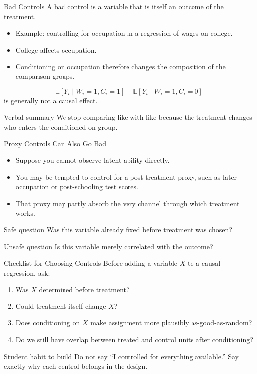 \documentclass[11pt,aspectratio=169]{beamer}
\newcommand{\E}{\mathbb{E}}
\newcommand{\derivbutton}[1]{\vspace{0.4em}\hfill\hyperlink{app:#1}{\beamerbutton{Appendix details}}}
\begin{document}
\begin{frame}{Bad Controls}
  \hypertarget{main:bad-control}{}
  A bad control is a variable that is itself an outcome of the treatment.
  \begin{itemize}
    \item Example: controlling for occupation in a regression of wages on college.
    \item College affects occupation.
    \item Conditioning on occupation therefore changes the composition of the comparison groups.
  \end{itemize}
  \[
    \E[Y_i \mid W_i=1,C_i=1]-\E[Y_i \mid W_i=1,C_i=0]
  \]
  is generally not a causal effect.
  \begin{block}{Verbal summary}
    We stop comparing like with like because the treatment changes who enters the conditioned-on group.
  \end{block}
  \derivbutton{bad-control-proof}
\end{frame}

\begin{frame}{Proxy Controls Can Also Go Bad}
  \begin{itemize}
    \item Suppose you cannot observe latent ability directly.
    \item You may be tempted to control for a post-treatment proxy, such as later occupation or post-schooling test scores.
    \item That proxy may partly absorb the very channel through which treatment works.
  \end{itemize}
  \begin{block}{Safe question}
    Was this variable already fixed before treatment was chosen?
  \end{block}
  \begin{block}{Unsafe question}
    Is this variable merely correlated with the outcome?
  \end{block}
\end{frame}

\begin{frame}{Checklist for Choosing Controls}
  Before adding a variable \(X\) to a causal regression, ask:
  \begin{enumerate}
    \item Was \(X\) determined before treatment?
    \item Could treatment itself change \(X\)?
    \item Does conditioning on \(X\) make assignment more plausibly as-good-as-random?
    \item Do we still have overlap between treated and control units after conditioning?
  \end{enumerate}
  \begin{block}{Student habit to build}
    Do not say ``I controlled for everything available.'' Say exactly why each control belongs in the design.
  \end{block}
\end{frame}
\end{document}
